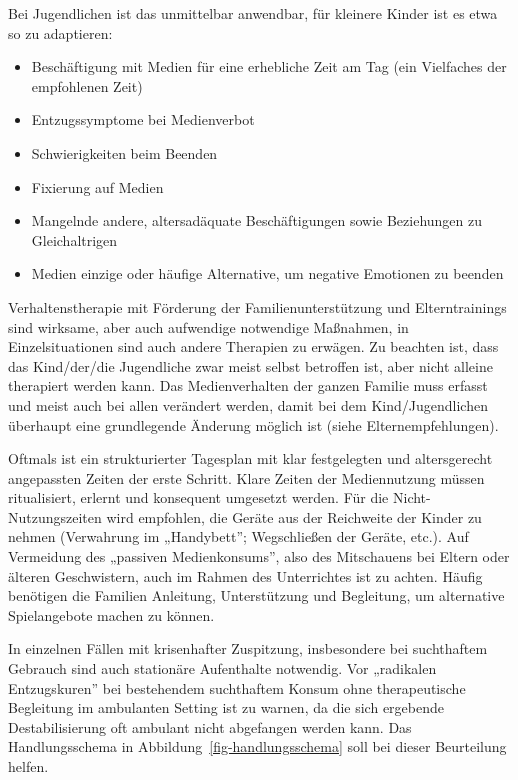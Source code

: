 \documentclass[
  letterpaper,
  DIV=11]{scrartcl}
\begin{document}
Bei Jugendlichen ist das unmittelbar anwendbar, für kleinere Kinder ist
es etwa so zu adaptieren:

\begin{itemize}
\item
  Beschäftigung mit Medien für eine erhebliche Zeit am Tag (ein
  Vielfaches der empfohlenen Zeit)
\item
  Entzugssymptome bei Medienverbot
\item
  Schwierigkeiten beim Beenden
\item
  Fixierung auf Medien
\item
  Mangelnde andere, altersadäquate Beschäftigungen sowie Beziehungen zu
  Gleichaltrigen
\item
  Medien einzige oder häufige Alternative, um negative Emotionen zu
  beenden
\end{itemize}

Verhaltenstherapie mit Förderung der Familienunterstützung und
Elterntrainings sind wirksame, aber auch aufwendige notwendige
Maßnahmen, in Einzelsituationen sind auch andere Therapien zu erwägen.
Zu beachten ist, dass das Kind/der/die Jugendliche zwar meist selbst
betroffen ist, aber nicht alleine therapiert werden kann. Das
Medienverhalten der ganzen Familie muss erfasst und meist auch bei allen
verändert werden, damit bei dem Kind/Jugendlichen überhaupt eine
grundlegende Änderung möglich ist (siehe Elternempfehlungen).

Oftmals ist ein strukturierter Tagesplan mit klar festgelegten und
altersgerecht angepassten Zeiten der erste Schritt. Klare Zeiten der
Mediennutzung müssen ritualisiert, erlernt und konsequent umgesetzt
werden. Für die Nicht-Nutzungszeiten wird empfohlen, die Geräte aus der
Reichweite der Kinder zu nehmen (Verwahrung im „Handybett'';
Wegschließen der Geräte, etc.). Auf Vermeidung des „passiven
Medienkonsums'', also des Mitschauens bei Eltern oder älteren
Geschwistern, auch im Rahmen des Unterrichtes ist zu achten. Häufig
benötigen die Familien Anleitung, Unterstützung und Begleitung, um
alternative Spielangebote machen zu können.

In einzelnen Fällen mit krisenhafter Zuspitzung, insbesondere bei
suchthaftem Gebrauch sind auch stationäre Aufenthalte notwendig. Vor
„radikalen Entzugskuren'' bei bestehendem suchthaftem Konsum ohne
therapeutische Begleitung im ambulanten Setting ist zu warnen, da die
sich ergebende Destabilisierung oft ambulant nicht abgefangen werden
kann. Das Handlungsschema in Abbildung~\ref{fig-handlungsschema} soll
bei dieser Beurteilung helfen.
\end{document}
